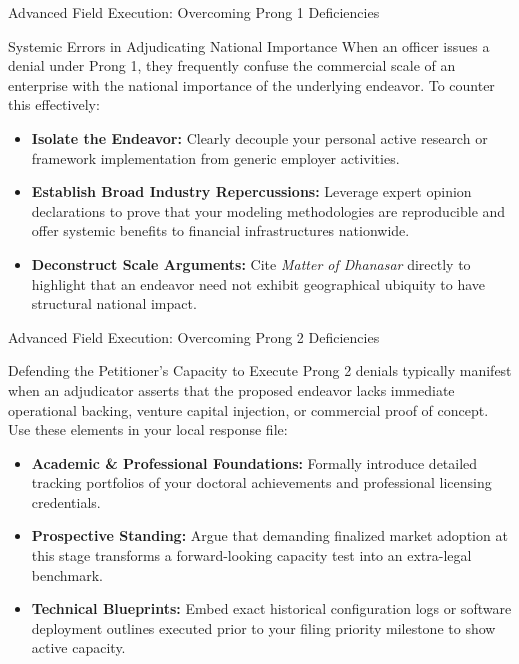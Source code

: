 \documentclass[11pt]{beamer}
\begin{document}
	\begin{frame}{Advanced Field Execution: Overcoming Prong 1 Deficiencies}
		\scriptsize
		\begin{block}{Systemic Errors in Adjudicating National Importance}
			When an officer issues a denial under Prong 1, they frequently confuse the commercial scale of an enterprise with the national importance of the underlying endeavor. To counter this effectively:
			\begin{itemize}
				\item \textbf{Isolate the Endeavor:} Clearly decouple your personal active research or framework implementation from generic employer activities.
				\item \textbf{Establish Broad Industry Repercussions:} Leverage expert opinion declarations to prove that your modeling methodologies are reproducible and offer systemic benefits to financial infrastructures nationwide.
				\item \textbf{Deconstruct Scale Arguments:} Cite \textit{Matter of Dhanasar} directly to highlight that an endeavor need not exhibit geographical ubiquity to have structural national impact.
			\end{itemize}
		\end{block}
	\end{frame}
	
	\begin{frame}{Advanced Field Execution: Overcoming Prong 2 Deficiencies}
		\scriptsize
		\begin{block}{Defending the Petitioner's Capacity to Execute}
			Prong 2 denials typically manifest when an adjudicator asserts that the proposed endeavor lacks immediate operational backing, venture capital injection, or commercial proof of concept. Use these elements in your local response file:
			\begin{itemize}
				\item \textbf{Academic \& Professional Foundations:} Formally introduce detailed tracking portfolios of your doctoral achievements and professional licensing credentials.
				\item \textbf{Prospective Standing:} Argue that demanding finalized market adoption at this stage transforms a forward-looking capacity test into an extra-legal benchmark.
				\item \textbf{Technical Blueprints:} Embed exact historical configuration logs or software deployment outlines executed prior to your filing priority milestone to show active capacity.
			\end{itemize}
		\end{block}
	\end{frame}
	
\end{document}
